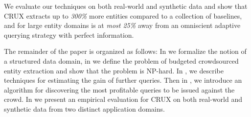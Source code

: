We evaluate our techniques on both real-world and synthetic data and show that CRUX extracts up to {\em 300\%} more entities compared to a collection of baselines, and for large entity domains is at {\em most 25\%} away from an omniscient adaptive querying strategy with perfect information.

The remainder of the paper is organized as follows: In  we formalize the notion of a structured data domain, in  we define the problem of budgeted crowdsourced entity extraction and show that the problem is NP-hard. In , we describe techniques for estimating the gain of further queries. Then in , we introduce an algorithm for discovering the most profitable queries to be issued against the crowd. In  we present an empirical evaluation for CRUX on both real-world and synthetic data from two distinct application domains. 